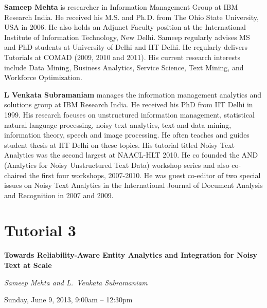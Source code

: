 \begin{bio}
\setlength{\parskip}{1ex}

\noindent
{\bfseries Sameep Mehta} is researcher in Information Management Group at IBM Research India. He received his M.S. and Ph.D. from The Ohio State University, USA in 2006. He also holds an Adjunct Faculty position at the International Institute of Information Technology, New Delhi. Sameep regularly advises MS and PhD students at University of Delhi and IIT Delhi. He regularly delivers Tutorials at COMAD (2009, 2010 and 2011). His current research interests include Data Mining, Business Analytics, Service Science, Text Mining, and Workforce Optimization.
\noindent

{\bfseries L Venkata Subramaniam} manages the information management analytics and solutions group at IBM Research India. He received his PhD from IIT Delhi in 1999. His research focuses on unstructured information management, statistical natural language processing, noisy text analytics, text and data mining, information theory, speech and image processing. He often teaches and guides student thesis at IIT Delhi on these topics. His tutorial titled Noisy Text Analytics was the second largest at NAACL-HLT 2010. He co founded the AND (Analytics for Noisy Unstructured Text Data) workshop series and also co-chaired the first four workshops, 2007-2010. He was guest co-editor of two special issues on Noisy Text Analytics in the International Journal of Document Analysis and Recognition in 2007 and 2009.
\end{bio}


\section%
    [\textbf{T3:} Towards Reliability-Aware Entity Analytics and Integration for Noisy Text at Scale (S. Mehta and L.~V. Subramaniam)]
    {Tutorial 3}
\label{TutC}
\begin{center}
\begin{Large}
\bfseries Towards Reliability-Aware Entity Analytics and Integration for Noisy Text at Scale\\ \vspace{2em}\par
\end{Large}

{\itshape Sameep Mehta and L.~Venkata Subramaniam}\vspace{1em}\par
Sunday, June 9, 2013, 9:00am -- 12:30pm \vspace{1em}\\
\TutLocC
\end{center}

